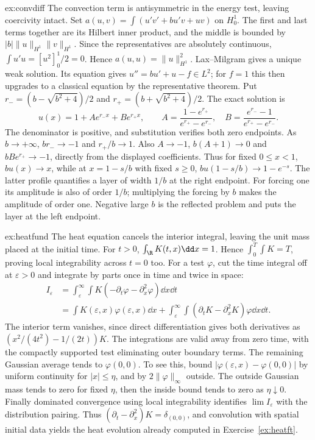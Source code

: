 \begin{solution}{ex:convdiff}
\idea The convection term is antisymmetric in the energy test, leaving coercivity intact.
\writeup Set $a(u,v)=\int(u'v'+bu'v+uv)$ on $H^1_0$. The first and last terms together are its Hilbert inner product, and the middle is bounded by $|b|\|u\|_{H^1}\|v\|_{H^1}$. Since the representatives are absolutely continuous, $\int u'u=[u^2]_0^1/2=0$. Hence $a(u,u)=\|u\|_{H^1}^2$. Lax--Milgram gives a unique weak solution. Its equation gives $u''=bu'+u-f\in L^2$; for $f=1$ this then upgrades to a classical equation by the representative theorem.
Put $r_-=(b-\sqrt{b^2+4})/2$ and $r_+=(b+\sqrt{b^2+4})/2$. The exact solution is
\[
u(x)=1+A e^{r_-x}+B e^{r_+x},\qquad
A=\frac{1-e^{r_+}}{e^{r_+}-e^{r_-}},\quad
B=\frac{e^{r_-}-1}{e^{r_+}-e^{r_-}}.
\]
The denominator is positive, and substitution verifies both zero endpoints.
As $b\to+\infty$, $br_-\to-1$ and $r_+/b\to1$. Also $A\to-1$, $b(A+1)\to0$ and $bBe^{r_+}\to-1$, directly from the displayed coefficients. Thus for fixed $0\le x<1$, $bu(x)\to x$, while at $x=1-s/b$ with fixed $s\ge0$,
$bu(1-s/b)\to1-e^{-s}$.
The latter profile quantifies a layer of width $1/b$ at the right endpoint. For forcing one its amplitude is also of order $1/b$; multiplying the forcing by $b$ makes the amplitude of order one. Negative large $b$ is the reflected problem and puts the layer at the left endpoint.
\end{solution}

\begin{solution}{ex:heatfund}
\idea The heat equation cancels the interior integral, leaving the unit mass placed at the initial time.
\writeup For $t>0$, $\int_\R K(t,x)\dd x=1$. Hence $\int_0^T\int K=T$, proving local integrability across $t=0$ too. For a test $\varphi$, cut the time integral off at $\varepsilon>0$ and integrate by parts once in time and twice in space:
\[
\begin{aligned}
I_\varepsilon&=\int_\varepsilon^\infty\!\int K(-\partial_t\varphi-\partial_x^2\varphi)\dd x\dd t\\
&=\int K(\varepsilon,x)\varphi(\varepsilon,x)\dd x
+\int_\varepsilon^\infty\!\int(\partial_tK-\partial_x^2K)\varphi\dd x\dd t.
\end{aligned}
\]
The interior term vanishes, since direct differentiation gives both derivatives as $(x^2/(4t^2)-1/(2t))K$. The integrations are valid away from zero time, with the compactly supported test eliminating outer boundary terms.
The remaining Gaussian average tends to $\varphi(0,0)$. To see this, bound $|\varphi(\varepsilon,x)-\varphi(0,0)|$ by uniform continuity for $|x|\le\eta$, and by $2\|\varphi\|_\infty$ outside. The outside Gaussian mass tends to zero for fixed $\eta$, then the inside bound tends to zero as $\eta\downarrow0$. Finally dominated convergence using local integrability identifies $\lim I_\varepsilon$ with the distribution pairing. Thus $(\partial_t-\partial_x^2)K=\delta_{(0,0)}$, and convolution with spatial initial data yields the heat evolution already computed in Exercise~\ref{ex:heatft}.
\end{solution}


